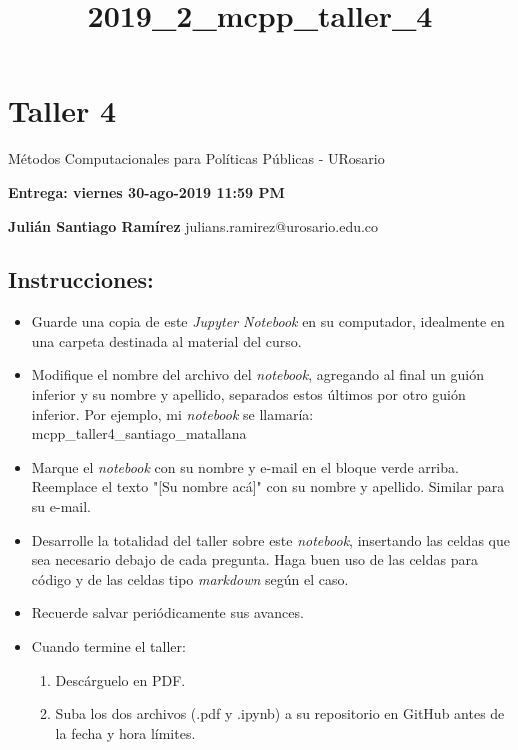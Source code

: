 \documentclass[11pt]{article}
\title{2019\_2\_mcpp\_taller\_4}
\providecommand{\tightlist}{%
      \setlength{\itemsep}{0pt}\setlength{\parskip}{0pt}}
\begin{document}
    
    
    \maketitle
    
    

    
    \section{Taller 4}\label{taller-4}

Métodos Computacionales para Políticas Públicas - URosario

\textbf{Entrega: viernes 30-ago-2019 11:59 PM}

    \textbf{Julián Santiago Ramírez} julians.ramirez@urosario.edu.co

    \subsection{Instrucciones:}\label{instrucciones}

\begin{itemize}
\tightlist
\item
  Guarde una copia de este \emph{Jupyter Notebook} en su computador,
  idealmente en una carpeta destinada al material del curso.
\item
  Modifique el nombre del archivo del \emph{notebook}, agregando al
  final un guión inferior y su nombre y apellido, separados estos
  últimos por otro guión inferior. Por ejemplo, mi \emph{notebook} se
  llamaría: mcpp\_taller4\_santiago\_matallana
\item
  Marque el \emph{notebook} con su nombre y e-mail en el bloque verde
  arriba. Reemplace el texto "{[}Su nombre acá{]}" con su nombre y
  apellido. Similar para su e-mail.
\item
  Desarrolle la totalidad del taller sobre este \emph{notebook},
  insertando las celdas que sea necesario debajo de cada pregunta. Haga
  buen uso de las celdas para código y de las celdas tipo
  \emph{markdown} según el caso.
\item
  Recuerde salvar periódicamente sus avances.
\item
  Cuando termine el taller:

  \begin{enumerate}
  \def\labelenumi{\arabic{enumi}.}
  \tightlist
  \item
    Descárguelo en PDF.
  \item
    Suba los dos archivos (.pdf y .ipynb) a su repositorio en GitHub
    antes de la fecha y hora límites.
  \end{enumerate}
\end{itemize}
\end{document}
